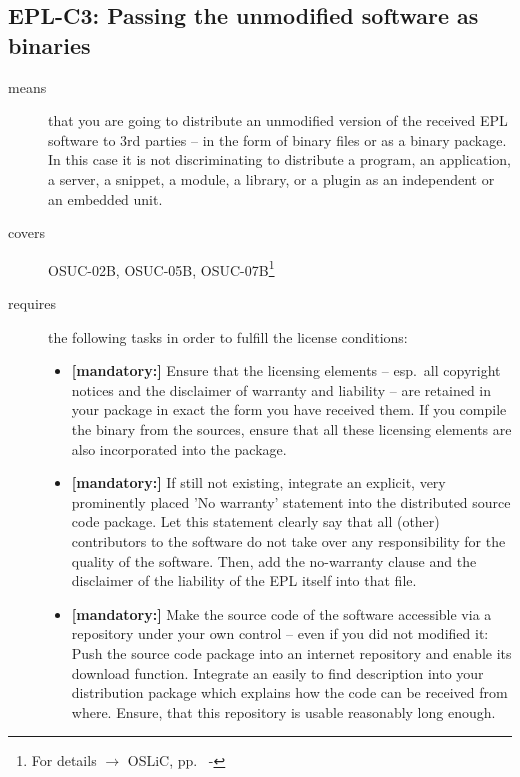 \subsection{EPL-C3: Passing the unmodified software as binaries} 
\label{OSUC-02B-EPL} \label{OSUC-05B-EPL} \label{OSUC-07B-EPL} 

\begin{description}
\item[means] that you are going to distribute an unmodified version of the
received EPL software to 3rd parties -- in the form of binary files or as a
bi\-na\-ry package. In this case it is not discriminating to distribute a
program, an application, a server, a snippet, a module, a library, or a plugin
as an independent or an embedded unit.

\item[covers] OSUC-02B, OSUC-05B, OSUC-07B\footnote{For details $\rightarrow$
OSLiC, pp.\ \pageref{OSUC-02B-DEF} - \pageref{OSUC-07B-DEF}}

\item[requires] the following tasks in order to fulfill the license conditions:
\begin{itemize}
  
  \item \textbf{[mandatory:]} Ensure that the licensing elements -- esp.\ all
  copyright notices and the disclaimer of warranty and liability -- are retained
  in your package in exact the form you have received them. If you compile the
  binary from the sources, ensure that all these licensing elements are also
  incorporated into the package.
  
  \item \textbf{[mandatory:]} If still not existing, integrate an explicit, very
  prominently placed 'No warranty' statement into the distributed source code
  package. Let this statement clearly say that all (other) contributors to the
  software do not take over any responsibility for the quality of the software.
  Then, add the no-warranty clause and the disclaimer of the liability of the
  EPL itself into that file.

  \item \textbf{[mandatory:]} Make the source code of the software accessible
  via a repository under your own control -- even if you did not modified it:
  Push the source code package into an internet repository and enable its
  download function. Integrate an easily to find description into your
  distribution package which explains how the code can be received from where.
  Ensure, that this repository is usable reasonably long enough.
  

\end{itemize}
\end{description}
